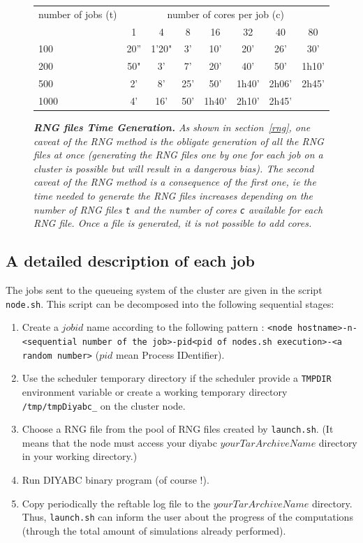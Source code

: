 \begin{figure}[htb]
\centering \it	
  \begin{tabular}{|  l || c | c | c | c | c | c | c | }
	   \hline
	   number of jobs (t) & \multicolumn{7}{c|}{number of cores per job (c)} \\
	          & 1 & 4   & 8     & 16 & 32 & 40 & 80 \\
	   \hline \hline
	   100 & 20''  & 1'20" & 3'  & 10'   & 20'   & 26'   & 30' \\
	   \hline
	   200 & 50" & 3'    & 7'  & 20'   & 40'   & 50'   & 1h10' \\
	   \hline
	   500 & 2'  & 8'    & 25' & 50'   & 1h40' & 2h06' & 2h45' \\
	   \hline
	   1000 & 4' & 16'   & 50' & 1h40' & 2h10' & 2h45' & \\
	   \hline
   \end{tabular}
  \caption[width=.6\textwidth]{\label{fig:rngTimeGeneration} \it\footnotesize
    \textbf{RNG files Time Generation.} As shown in section~\ref{rng}, one caveat of the RNG
    method is the obligate generation of all the RNG files at once (generating the RNG files one by one 
    for each job on a cluster is possible but will result in a dangerous bias). The second
    caveat of the RNG method is a consequence of the first one, ie the time needed to generate the RNG
    files increases depending on the number of RNG files \texttt{t} and the number of cores \texttt{c}
    available for each RNG file. Once a file is generated, it is not possible to add cores. }
\end{figure}


\subsection{A detailed description of each job}\label{sub:node.sh}
The jobs sent to the queueing system of the cluster are given in the script \texttt{node.sh}. This script can be decomposed into the following sequential stages:
\begin{enumerate}
    \item Create a $job id$ name according to the following pattern : \texttt{<node hostname>-n-<sequential number of the job>-pid<pid of nodes.sh execution>-<a random number>} ($pid$ mean Process IDentifier).
    \item Use the scheduler temporary directory if the scheduler provide a \texttt{TMPDIR} environment variable or create a working temporary directory \texttt{/tmp/tmpDiyabc\_<job id>} on the cluster node.
    \item Choose a RNG file from the pool of RNG files created by \texttt{launch.sh}. (It means that the node must access your diyabc $yourTarArchiveName$ directory in your working directory.) 
    \item Run DIYABC binary program (of course !).
    \item Copy periodically the reftable log file to the $yourTarArchiveName$ directory. Thus, \texttt{launch.sh} can inform the user about the progress of the computations (through the total amount of simulations already performed).
\end{enumerate}

